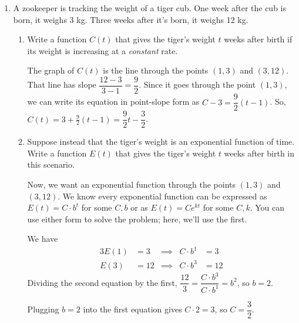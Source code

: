 \documentclass{article}
\theoremstyle{theorem}
\begin{document}
\begin{enumerate}
\begin{enumerate}
  \end{enumerate}

\item \label{fall20112-prefinal-practice3-6-modified}   

  A zookeeper is tracking the weight of a tiger cub. One week after the cub is born, it weighs 3 kg. Three weeks after it's born, it weighs 12 kg. 

  \begin{enumerate}
  \item
    \begin{problem}[\stretch{0.75}]
      Write a function $C(t)$ that gives the tiger's weight $t$ weeks after birth if its weight is increasing at a \emph{constant} rate.
    \end{problem}

    \begin{solution}
      The graph of $C(t)$ is the line through the points $(1, 3)$ and $(3, 12)$. That line has slope $\dfrac{12-3}{3-1}=\dfrac{9}{2}$. Since it goes through the point $(1, 3)$, we can write its equation in point-slope form as $C - 3 = \dfrac{9}{2}(t - 1)$. So, $C(t) = \boxed{3 + \frac{9}{2}(t - 1)} = \dfrac{9}{2} t - \dfrac{3}{2}$.
    \end{solution}

  \item
    \begin{problem}[\vfill]
      Suppose instead that the tiger's weight is an exponential function of time. Write a function $E(t)$ that gives the tiger's weight $t$ weeks after birth in this scenario. 
    \end{problem}

    \begin{solution}
      Now, we want an exponential function through the points $(1, 3)$ and $(3, 12)$. We know every exponential function can be expressed as $E(t) = C \cdot b^t$ for some $C, b$ or as $E(t) = C e^{kt}$ for some $C, k$. You can use either form to solve the problem; here, we'll use the first.

      We have
      \begin{alignat*}{3}
        E(1) &= 3 & \implies & C \cdot b^1 &= 3 \\
        E(3) &= 12 & \implies & C \cdot b^3 &= 12 
      \end{alignat*}
      Dividing the second equation by the first, $\dfrac{12}{3} = \dfrac{C \cdot b^3}{C \cdot b^1} = b^2$, so $b = 2$.

      Plugging $b = 2$ into the first equation gives $C \cdot 2 = 3$, so $C = \dfrac{3}{2}$.


\end{solution}
\end{enumerate}
\end{enumerate}
\end{document}
